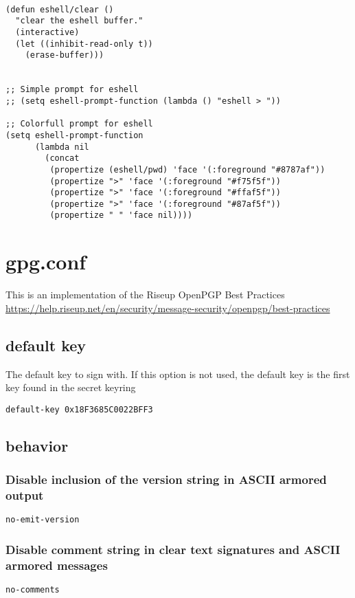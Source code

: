 \documentclass[11pt]{article}
\begin{document}
\begin{verbatim}

(defun eshell/clear ()
  "clear the eshell buffer."
  (interactive)
  (let ((inhibit-read-only t))
    (erase-buffer)))


;; Simple prompt for eshell
;; (setq eshell-prompt-function (lambda () "eshell > "))

;; Colorfull prompt for eshell
(setq eshell-prompt-function
      (lambda nil
        (concat
         (propertize (eshell/pwd) 'face '(:foreground "#8787af"))
         (propertize ">" 'face '(:foreground "#f75f5f"))
         (propertize ">" 'face '(:foreground "#ffaf5f"))
         (propertize ">" 'face '(:foreground "#87af5f"))
         (propertize " " 'face nil))))
\end{verbatim}


\section{gpg.conf}
\label{sec:orgb55cd9f}

This is an implementation of the Riseup OpenPGP Best Practices
\url{https://help.riseup.net/en/security/message-security/openpgp/best-practices}

\subsection{default key}
\label{sec:orgef47f3a}
The default key to sign with. If this option is not used, the default key is the first key found in the secret keyring
\begin{verbatim}
default-key 0x18F3685C0022BFF3
\end{verbatim}
\subsection{behavior}
\label{sec:org82f0636}
\subsubsection{Disable inclusion of the version string in ASCII armored output}
\label{sec:org112d000}
\begin{verbatim}
no-emit-version
\end{verbatim}
\subsubsection{Disable comment string in clear text signatures and ASCII armored messages}
\label{sec:org1a2176c}
\begin{verbatim}
no-comments
\end{verbatim}
\end{document}
